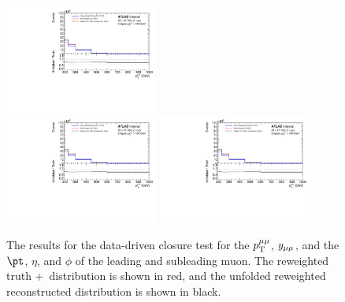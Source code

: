 \begin{figure}[h!]
  \includegraphics[page=561,width=0.45\textwidth]{figures/IBUClosureTests.pdf} \\
  \includegraphics[page=567,width=0.45\textwidth]{figures/IBUClosureTests.pdf}
  \includegraphics[page=573,width=0.45\textwidth]{figures/IBUClosureTests.pdf}
  \caption{The results for the data-driven closure test for the $p_\mathrm{T}^{\mu\mu}$, $y_{\mu\mu}$, and the $\pt$, $\eta$, and $\phi$ of the leading and subleading muon. The reweighted truth \powheg+\pythia~distribution is shown in red, and the unfolded reweighted reconstructed distribution is shown in black.}
  \label{fig:DDTestDilep}
\end{figure}

